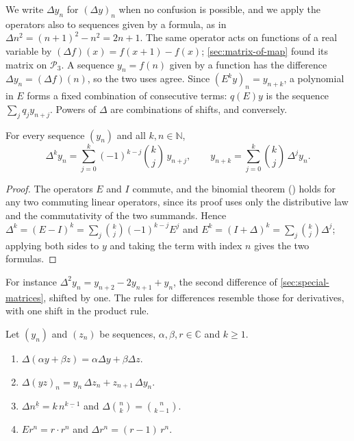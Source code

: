 We write $\Delta y_n$ for $(\Delta y)_n$ when no confusion is possible, and we apply the operators also to sequences given by a formula, as in $\Delta n^2=(n+1)^2-n^2=2n+1$. The same operator acts on functions of a real variable by $(\Delta f)(x)=f(x+1)-f(x)$; \cref{sec:matrix-of-map} found its matrix on $\mathcal P_3$. A sequence $y_n=f(n)$ given by a function has the difference $\Delta y_n=(\Delta f)(n)$, so the two uses agree. Since $(E^ky)_n=y_{n+k}$, a polynomial in $E$ forms a fixed combination of consecutive terms: $q(E)y$ is the sequence $\sum_jq_jy_{n+j}$. Powers of $\Delta$ are combinations of shifts, and conversely.

\begin{proposition}
\label{prop:difference-powers}
For every sequence $(y_n)$ and all $k,n\in\mathbb N$,
\[
\Delta^ky_n=\sum_{j=0}^k(-1)^{k-j}\binom kj\,y_{n+j},\qquad y_{n+k}=\sum_{j=0}^k\binom kj\,\Delta^jy_n .
\]
\end{proposition}

\begin{proof}
The operators $E$ and $I$ commute, and the binomial theorem () holds for any two commuting linear operators, since its proof uses only the distributive law and the commutativity of the two summands. Hence $\Delta^k=(E-I)^k=\sum_j\binom kj(-1)^{k-j}E^j$ and $E^k=(I+\Delta)^k=\sum_j\binom kj\Delta^j$; applying both sides to $y$ and taking the term with index $n$ gives the two formulas.
\end{proof}

For instance $\Delta^2y_n=y_{n+2}-2y_{n+1}+y_n$, the second difference of \cref{sec:special-matrices}, shifted by one. The rules for differences resemble those for derivatives, with one shift in the product rule.

\begin{proposition}
\label{prop:difference-rules}
Let $(y_n)$ and $(z_n)$ be sequences, $\alpha,\beta,r\in\mathbb C$ and $k\ge1$.
\begin{enumerate}
\item $\Delta(\alpha y+\beta z)=\alpha\Delta y+\beta\Delta z$.
\item $\Delta(yz)_n=y_n\,\Delta z_n+z_{n+1}\,\Delta y_n$.
\item $\Delta n^{\underline k}=k\,n^{\underline{k-1}}$ and $\Delta\binom nk=\binom n{k-1}$.
\item $Er^n=r\cdot r^n$ and $\Delta r^n=(r-1)\,r^n$.
\end{enumerate}
\end{proposition}

